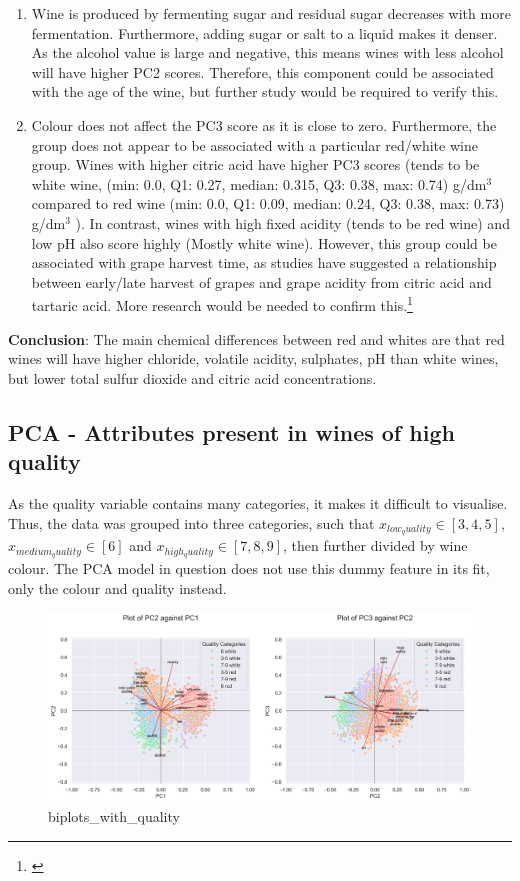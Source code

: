 \documentclass[
]{article}
\begin{document}
\begin{enumerate}
\def\labelenumi{\arabic{enumi}.}
\setcounter{enumi}{1}
\item
  Wine is produced by fermenting sugar and residual sugar decreases with
  more fermentation. Furthermore, adding sugar or salt to a liquid makes
  it denser. As the alcohol value is large and negative, this means
  wines with less alcohol will have higher PC2 scores. Therefore, this
  component could be associated with the age of the wine, but further
  study would be required to verify this.
\item
  Colour does not affect the PC3 score as it is close to zero.
  Furthermore, the group does not appear to be associated with a
  particular red/white wine group. Wines with higher citric acid have
  higher PC3 scores (tends to be white wine, (min: 0.0, Q1: 0.27,
  median: 0.315, Q3: 0.38, max: 0.74) g/dm\(^3\) compared to red wine
  (min: 0.0, Q1: 0.09, median: 0.24, Q3: 0.38, max: 0.73) g/dm\(^3\) ).
  In contrast, wines with high fixed acidity (tends to be red wine) and
  low pH also score highly (Mostly white wine). However, this group
  could be associated with grape harvest time, as studies have suggested
  a relationship between early/late harvest of grapes and grape acidity
  from citric acid and tartaric acid. More research would be needed to
  confirm this.\footnote{\textcite{RN4}}
\end{enumerate}

\textbf{Conclusion}: The main chemical differences between red and
whites are that red wines will have higher chloride, volatile acidity,
sulphates, pH than white wines, but lower total sulfur dioxide and
citric acid concentrations.

\subsection{PCA - Attributes present in wines of high
quality}\label{pca---attributes-present-in-wines-of-high-quality}

As the quality variable contains many categories, it makes it difficult
to visualise. Thus, the data was grouped into three categories, such
that \(x_{low_quality} \in [3, 4, 5]\), \(x_{medium_quality} \in [6]\)
and \(x_{high_quality} \in [7, 8, 9]\), then further divided by wine
colour. The PCA model in question does not use this dummy feature in its
fit, only the colour and quality instead.

\begin{figure}
\centering
\includegraphics{wine_quality_pc2_vs_pc1_with_quality_new.png}
\caption{biplots\_with\_quality}
\end{figure}
\end{document}
